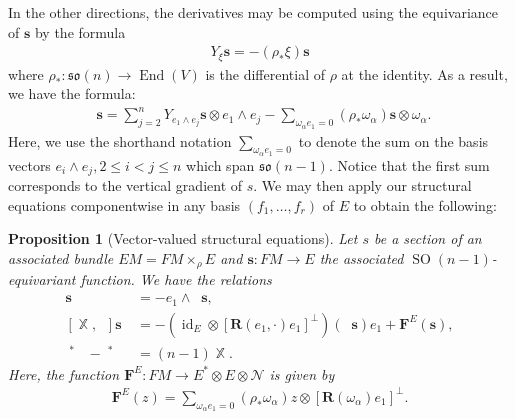 \documentclass[12pt]{amsart}
\numberwithin{numbering}{section}
\theoremstyle{plain}
\newtheorem{pps}[numbering]{Proposition}
\theoremstyle{definition}
\theoremstyle{remark}
\numberwithin{equation}{section}
\DeclareMathOperator{\identity}{id}
\DeclareMathOperator{\End}{End}
\DeclareMathOperator{\SO}{SO}
\DeclareMathOperator{\nv}{\nabla_{\mathbb{V}}}
\DeclareMathOperator{\nh}{\nabla_{\mathbb{H}}}
\DeclareMathOperator{\xx}{\mathbb{X}}
\newcommand{\rfm}{\mathbf{R}}
\newcommand{\frk}[1]{\mathfrak{#1}}
\begin{document}
In the other directions, the derivatives may be computed using the equivariance of $\mathbf{s}$ by the formula 
\begin{align}
Y_\xi \mathbf{s} = - (\rho_* \xi) \mathbf{s}
\end{align}
where $\rho_*: \frk{so}(n) \to \End(V)$ is the differential of $\rho$ at the identity. As a result, we have the formula:
\begin{align*}
\nv \mathbf{s} = \sum_{j=2}^n Y_{e_1 \wedge e_j} \mathbf{s} \otimes e_1 \wedge e_j - \sum_{\omega_\alpha e_1 = 0} (\rho_* \omega_\alpha) \mathbf{s} \otimes \omega_\alpha.
\end{align*}
Here, we use the shorthand notation $\sum_{\omega_\alpha e_1 = 0}$ to denote the sum on the basis vectors $e_i \wedge e_j, 2 \leq i < j \leq n$ which span $\frk{so}(n-1)$. Notice that the first sum corresponds to the vertical gradient of $s$. We may then apply our structural equations componentwise in any basis $(f_1, \ldots, f_r)$ of $E$ to obtain the following:

\begin{pps}[Vector-valued structural equations] \label{pps:vec_struct}
Let $s$ be a section of an associated bundle $EM = FM \times_\rho E$ and $\mathbf{s}: FM \to E$ the associated $\SO(n-1)$-equivariant function. We have the relations
\begin{align}
[\xx, \nv] \mathbf{s} &= - e_1 \wedge \nh \mathbf{s}, \label{eq:struct_vec_1} \\
[\xx, \nh] \mathbf{s} &= - (\identity_E \otimes [\rfm(e_1, \cdot) e_1]^\perp) (\nv \mathbf{s})e_1 + \mathbf{F}^E(\mathbf{s}), \label{eq:struct_vec_2} \\ 
\nv^* \nh - \nh^* \nv &= (n-1) \xx. \label{eq:struct_vec_3}
\end{align}
Here, the function $\mathbf{F}^E: FM \to E^* \otimes E \otimes \mathcal{N}$ is given by 
\begin{align} \label{eq:extra_curv_term}
\mathbf{F}^E(z) = \sum_{\omega_\alpha e_1 = 0} (\rho_* \omega_\alpha) z \otimes [\rfm(\omega_\alpha) e_1]^\perp.
\end{align}
\end{pps}
\end{document}
